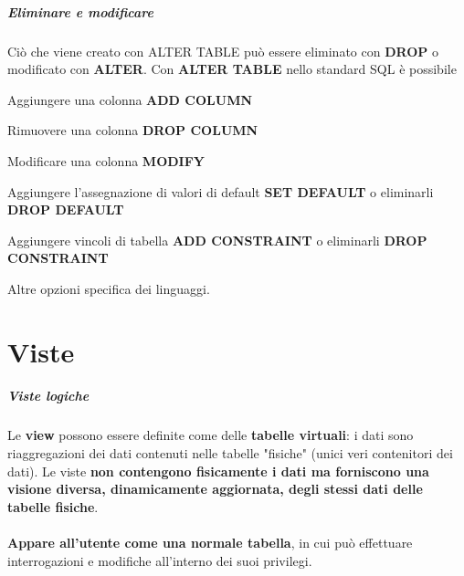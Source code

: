 \documentclass[10pt]{book}
\begin{document}
\paragraph{Eliminare e modificare} Ciò che viene creato con ALTER TABLE può essere eliminato con \textbf{DROP} o modificato con \textbf{ALTER}. Con \textbf{ALTER TABLE} nello standard SQL è possibile
\begin{list}{}{}
	\item Aggiungere una colonna \textbf{ADD COLUMN}
	\item Rimuovere una colonna \textbf{DROP COLUMN}
	\item Modificare una colonna \textbf{MODIFY}
	\item Aggiungere l'assegnazione di valori di default \textbf{SET DEFAULT} o eliminarli \textbf{DROP DEFAULT}
	\item Aggiungere vincoli di tabella \textbf{ADD CONSTRAINT} o eliminarli \textbf{DROP CONSTRAINT}
	\item Altre opzioni specifica dei linguaggi.
\end{list}
\chapter{Viste}
\paragraph{Viste logiche} Le \textbf{view} possono essere definite come delle \textbf{tabelle virtuali}: i dati sono riaggregazioni dei dati contenuti nelle tabelle "fisiche" (unici veri contenitori dei dati). Le viste \textbf{non contengono fisicamente i dati ma forniscono una visione diversa, dinamicamente aggiornata, degli stessi dati delle tabelle fisiche}.\\\\
\textbf{Appare all'utente come una normale tabella}, in cui può effettuare interrogazioni e modifiche all'interno dei suoi privilegi.
\end{document}
